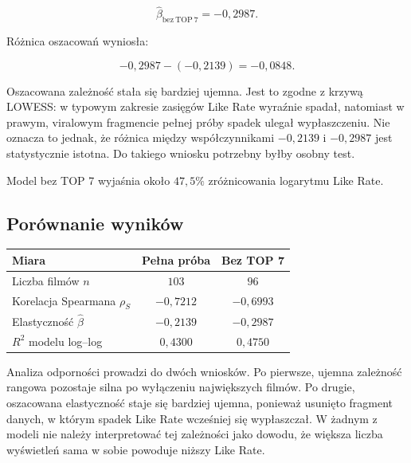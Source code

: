 \documentclass[12pt,a4paper]{article}
\begin{document}
\[
\widehat{\beta}_{\mathrm{bez\ TOP\ 7}}=-0{,}2987.
\]

Różnica oszacowań wyniosła:

\[
-0{,}2987-(-0{,}2139)=-0{,}0848.
\]

Oszacowana zależność stała się bardziej ujemna. Jest to zgodne z krzywą LOWESS: w typowym zakresie zasięgów Like Rate wyraźnie spadał, natomiast w prawym, viralowym fragmencie pełnej próby spadek ulegał wypłaszczeniu. Nie oznacza to jednak, że różnica między współczynnikami $-0{,}2139$ i $-0{,}2987$ jest statystycznie istotna. Do takiego wniosku potrzebny byłby osobny test.

Model bez TOP 7 wyjaśnia około $47{,}5\%$ zróżnicowania logarytmu Like Rate.

\subsection{Porównanie wyników}

\begin{center}
\begin{tabular}{lcc}
\toprule
Miara & Pełna próba & Bez TOP 7 \\
\midrule
Liczba filmów $n$ & $103$ & $96$ \\
Korelacja Spearmana $\rho_S$ & $-0{,}7212$ & $-0{,}6993$ \\
Elastyczność $\widehat{\beta}$ & $-0{,}2139$ & $-0{,}2987$ \\
$R^2$ modelu log--log & $0{,}4300$ & $0{,}4750$ \\
\bottomrule
\end{tabular}
\end{center}

Analiza odporności prowadzi do dwóch wniosków. Po pierwsze, ujemna zależność rangowa pozostaje silna po wyłączeniu największych filmów. Po drugie, oszacowana elastyczność staje się bardziej ujemna, ponieważ usunięto fragment danych, w którym spadek Like Rate wcześniej się wypłaszczał. W żadnym z modeli nie należy interpretować tej zależności jako dowodu, że większa liczba wyświetleń sama w sobie powoduje niższy Like Rate.
\end{document}
